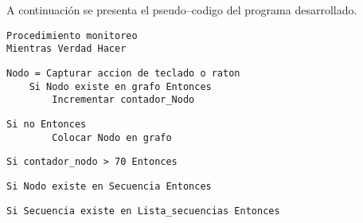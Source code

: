 
A continuaci\'on se presenta el pseudo--codigo del programa desarrollado.


\begin{table}[]
\begin{tiny}
\begin{lstlisting}[style=C]
Procedimiento monitoreo
Mientras Verdad Hacer

\end{lstlisting}
\end{tiny}
\end{table}

\begin{table}[]
\begin{tiny}
\begin{lstlisting}[style=C]
    Nodo = Capturar accion de teclado o raton
    Si Nodo existe en grafo Entonces
        Incrementar contador_Nodo

\end{lstlisting}
\end{tiny}
\end{table}

\begin{table}[]
\begin{tiny}
\begin{lstlisting}[style=C]
    Si no Entonces
        Colocar Nodo en grafo

\end{lstlisting}
\end{tiny}
\end{table}


\begin{table}[]
\begin{tiny}
\begin{lstlisting}[style=C]
        Si contador_nodo > 70 Entonces

\end{lstlisting}
\end{tiny}
\end{table}

        
\begin{table}[]
\begin{tiny}
\begin{lstlisting}[style=C]
            Si Nodo existe en Secuencia Entonces

\end{lstlisting}
\end{tiny}
\end{table}


\begin{table}[]
\begin{tiny}
\begin{lstlisting}[style=C]
                Si Secuencia existe en Lista_secuencias Entonces

\end{lstlisting}
\end{tiny}
\end{table}


